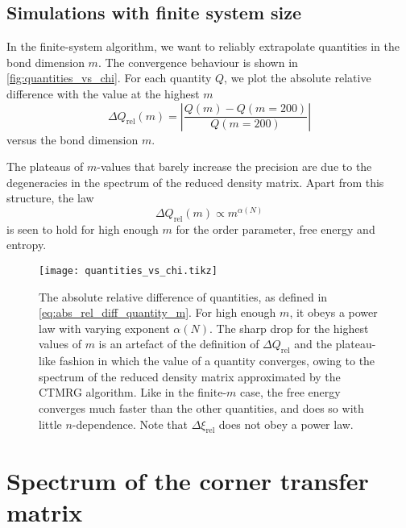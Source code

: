 


\subsection{Simulations with finite system size}
In the finite-system algorithm, we want to reliably extrapolate quantities in the bond dimension $m$.
The convergence behaviour is shown in \autoref{fig:quantities_vs_chi}.
For each quantity $Q$, we plot the absolute relative difference with the value at the highest $m$
\begin{equation}\label{eq:abs_rel_diff_quantity_m}
  \Delta Q_{\text{rel}}(m) = \left| \frac{Q(m) - Q(m = 200)}{Q(m = 200)} \right|
\end{equation}
versus the bond dimension $m$.

The plateaus of $m$-values that barely increase the precision are due to the degeneracies in the spectrum of the reduced
density matrix. Apart from this structure, the law
\begin{equation}\label{eq:abs_rel_diff_power_law_m}
  \Delta Q_{\text{rel}}(m) \propto m^{\alpha(N)}
\end{equation}
is seen to hold for high enough $m$ for the order parameter, free energy and entropy.


\begin{figure}
  \texttt{[image: quantities\_vs\_chi.tikz]}
  \caption{The absolute relative difference of quantities, as defined in \autoref{eq:abs_rel_diff_quantity_m}.
  For high enough $m$, it obeys a power law with varying exponent $\alpha(N)$.
  The sharp drop for the highest values of $m$ is an artefact of the definition of $\Delta Q_{\text{rel}}$ and the
  plateau-like fashion in which the value of a quantity converges,
  owing to the spectrum of the reduced density matrix approximated by the CTMRG algorithm.
  Like in the finite-$m$ case, the free energy converges much faster than the other quantities,
  and does so with little $n$-dependence.
  Note that $\Delta \xi_{\text{rel}}$ does not obey a power law.}\label{fig:quantities_vs_chi}
\end{figure}


\section{Spectrum of the corner transfer matrix}

